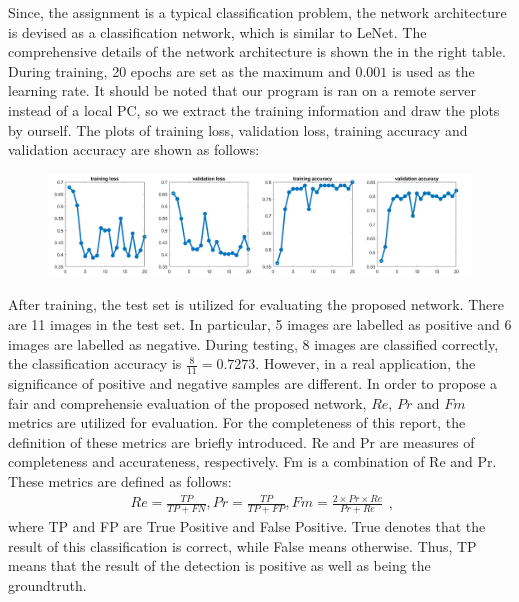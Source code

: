 \documentclass[UTF8]{article}
\begin{document}
Since, the assignment is a typical classification problem,
the network architecture is devised as a classification network, which is similar to LeNet.
%
The comprehensive details of the network architecture is shown the in the right table.
%
During training, 20 epochs are set as the maximum and $0.001$ is used as the learning rate.
%
It should be noted that our program is ran on a remote server instead of a local PC,
so we extract the training information and draw the plots by ourself.
%
The plots of training loss, validation loss, training accuracy and validation accuracy
are shown as follows:
\begin{figure}[htbp]	%
\centering
\includegraphics[width=\textwidth]{../imgs/loss.png}
\label{fig_bay}
\end{figure}

After training,
the test set is utilized for evaluating the proposed network.
%
There are 11 images in the test set.
%
In particular, 5 images are labelled as positive and 6 images are labelled as negative.
%
During testing,
8 images are classified correctly,
the classification accuracy is $\frac{8}{11} = 0.7273$.
%
However,
in a real application,
the significance of positive and negative samples are different.
%
In order to propose a fair and comprehensie evaluation of the proposed network,
$Re$, $Pr$ and $Fm$ metrics are utilized for evaluation.
%
For the completeness of this report,
the definition of these metrics are briefly introduced.
Re and Pr are measures of completeness and accurateness, respectively. Fm is a combination of Re and Pr. These metrics are defined as follows:
\begin{displaymath}
    \begin{aligned}
        Re = \frac{TP}{TP + FN},
        Pr = \frac{TP}{TP + FP},
        Fm = \frac{2 \times Pr \times Re}{Pr + Re}
    \end{aligned},
\end{displaymath}
where TP and FP are True Positive and False Positive. True denotes that the result of this classification is correct, while False means otherwise.
Thus, TP means that the result of the detection is positive as well as being the groundtruth.
\end{document}

